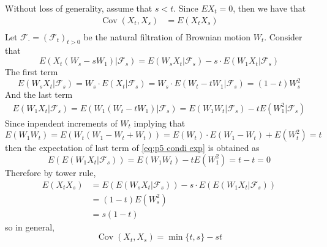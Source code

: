 \documentclass{homework}
\DeclareMathOperator{\cov}{Cov}
\begin{document}
    \problem

    \problem
    \begin{subproblem}
        \item
        Without loss of generality, assume that $s<t$.
        Since $EX_t=0$, then we have that
        \[\begin{aligned}
            \cov(X_t,X_s)&=E(X_tX_s)\\
        \end{aligned}\]
        Let $\mathcal F_\cdot=(\mathcal F_t)_{t>0}$ be
        the natural filtration of Brownian motion
        $W_t$. Consider that
        \begin{equation}
            \label{eq:p5 condi exp}
            E(X_t(W_s-sW_1)|\mathcal F_s)
            =E(W_sX_t|\mathcal F_s)
            -s\cdot E(W_1X_t|\mathcal F_s)
        \end{equation}
        The first term
        \[E(W_sX_t|\mathcal F_s)=W_s\cdot E(X_t|\mathcal F_s)
        =W_s\cdot E(W_t-tW_1|\mathcal F_s)=(1-t)W_s^2\]
        And the last term
        \begin{equation*}
            \begin{aligned}
                E(W_1X_t|\mathcal F_s)
                =E(W_1(W_t-tW_1)|\mathcal F_s)
                =E(W_1W_t|\mathcal F_s)-tE(W_1^2|\mathcal F_s)
            \end{aligned}
        \end{equation*}
        Since inpendent increments of $W_t$ implying that
        \[E(W_1W_t)=E(W_t(W_1-W_t+W_t))=E(W_t)\cdot E(W_1-W_t)+E(W_t^2)=t\]
        then the expectation of last term of \cref{eq:p5 condi exp}
        is obtained as
        \[E(E(W_1X_t|\mathcal F_s))=E(W_1W_t)-tE(W_1^2)=t-t=0\]
        Therefore by tower rule,
        \[\begin{aligned}
            E(X_tX_s)&=E(E(W_sX_t|\mathcal F_s))-s\cdot E(E(W_1X_t|\mathcal F_s))\\
            &=(1-t)E(W_s^2)\\
            &=s(1-t)
        \end{aligned}\]
        so in general,
        \begin{equation}
            \label{eq:p5 cov}
            \cov(X_t,X_s)=\min\{t,s\}-st
        \end{equation}


\end{subproblem}
\end{document}
